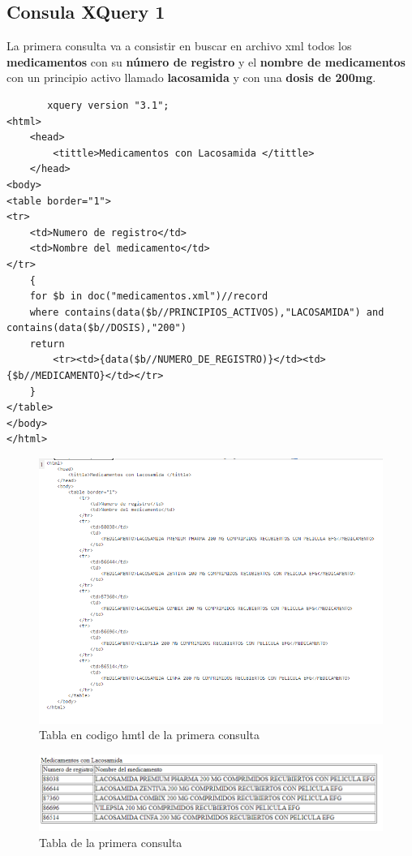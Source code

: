 \documentclass[../main.tex]{subfiles}
\begin{document}
\subsection{Consula XQuery 1}

La primera consulta va a consistir en buscar en archivo xml todos los \textbf{medicamentos} con su \textbf{número de registro} y el \textbf{nombre de medicamentos} con un principio activo llamado \textbf{lacosamida} y con una \textbf{dosis de 200mg}. 

\lstset{language=HTML}
\begin{lstlisting}
       xquery version "3.1";
<html>
    <head>
        <tittle>Medicamentos con Lacosamida </tittle>
    </head>
<body>
<table border="1">
<tr>
    <td>Numero de registro</td>
    <td>Nombre del medicamento</td>
</tr>
    {
    for $b in doc("medicamentos.xml")//record
    where contains(data($b//PRINCIPIOS_ACTIVOS),"LACOSAMIDA") and contains(data($b//DOSIS),"200")
    return 
        <tr><td>{data($b//NUMERO_DE_REGISTRO)}</td><td>{$b//MEDICAMENTO}</td></tr>
    }
</table>
</body>
</html>
\end{lstlisting}

\begin{figure}[h]
    \centering
    \includegraphics[scale=0.8]{images/xquery_1_output.PNG}
    \caption{Tabla en codigo hmtl de la primera consulta}
    \label{fig:mesh1}
\end{figure}
\newpage
\begin{figure}[h]
    \centering
    \includegraphics[scale=0.8]{images/xquery_1_html.PNG}
    \caption{Tabla de la primera consulta}
    \label{fig:mesh1}
\end{figure}
\end{document}
